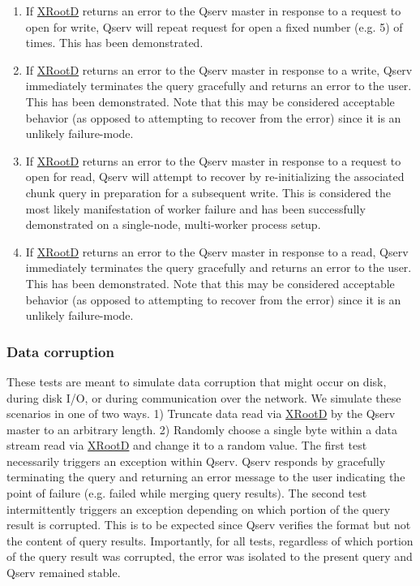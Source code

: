 \documentclass[DM,lsstdraft,toc]{lsstdoc}
\begin{document}
\begin{enumerate}
\def\labelenumi{\arabic{enumi}.}
\item
  If \href{http://xrootd.org}{XRootD} returns an error to the Qserv
  master in response to a request to open for write, Qserv will repeat
  request for open a fixed number (e.g. 5) of times. This has been
  demonstrated.
\item
  If \href{http://xrootd.org}{XRootD} returns an error to the Qserv
  master in response to a write, Qserv immediately terminates the query
  gracefully and returns an error to the user. This has been
  demonstrated. Note that this may be considered acceptable behavior (as
  opposed to attempting to recover from the error) since it is an
  unlikely failure-mode.
\item
  If \href{http://xrootd.org}{XRootD} returns an error to the Qserv
  master in response to a request to open for read, Qserv will attempt
  to recover by re-initializing the associated chunk query in
  preparation for a subsequent write. This is considered the most likely
  manifestation of worker failure and has been successfully demonstrated
  on a single-node, multi-worker process setup.
\item
  If \href{http://xrootd.org}{XRootD} returns an error to the Qserv
  master in response to a read, Qserv immediately terminates the query
  gracefully and returns an error to the user. This has been
  demonstrated. Note that this may be considered acceptable behavior (as
  opposed to attempting to recover from the error) since it is an
  unlikely failure-mode.
\end{enumerate}

\subsubsection{Data corruption}\label{data-corruption}

These tests are meant to simulate data corruption that might occur on
disk, during disk I/O, or during communication over the network. We
simulate these scenarios in one of two ways. 1) Truncate data read via
\href{http://xrootd.org}{XRootD} by the Qserv master to an arbitrary
length. 2) Randomly choose a single byte within a data stream read via
\href{http://xrootd.org}{XRootD} and change it to a random value. The
first test necessarily triggers an exception within Qserv. Qserv
responds by gracefully terminating the query and returning an error
message to the user indicating the point of failure (e.g. failed while
merging query results). The second test intermittently triggers an
exception depending on which portion of the query result is corrupted.
This is to be expected since Qserv verifies the format but not the
content of query results. Importantly, for all tests, regardless of
which portion of the query result was corrupted, the error was isolated
to the present query and Qserv remained stable.
\end{document}
